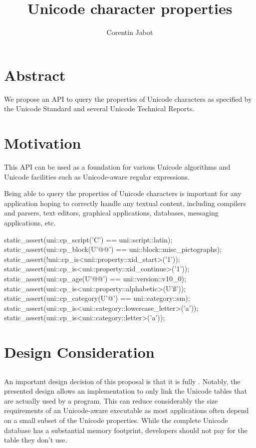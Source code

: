 \documentclass{wg21}
\title{Unicode character properties}
\author{Corentin Jabot}{corentin.jabot@gmail.com}
\begin{document}
\maketitle

\section{Abstract}

We propose an API to query the properties of Unicode characters as specified by the Unicode Standard and
several Unicode Technical Reports.

\section{Motivation}

This API can be used as a foundation for various Unicode algorithms and Unicode facilities such as Unicode-aware
regular expressions.

Being able to query the properties of Unicode characters is important for any application hoping to correctly
handle any textual content, including compilers and parsers, text editors, graphical applications, databases,
messaging applications, etc.

\begin{colorblock}

static_assert(uni::cp_script('C') == uni::script::latin);
static_assert(uni::cp_block(U'@@') == uni::block::misc_pictographs);
static_assert(!uni::cp_is<uni::property::xid_start>('1'));
static_assert(uni::cp_is<uni::property::xid_continue>('1'));
static_assert(uni::cp_age(U'@@') == uni::version::v10_0);
static_assert(uni::cp_is<uni::property::alphabetic>(U'ß'));
static_assert(uni::cp_category(U'@\cap@') == uni::category::sm);
static_assert(uni::cp_is<uni::category::lowercase_letter>('a'));
static_assert(uni::cp_is<uni::category::letter>('a'));

\end{colorblock}

\section{Design Consideration}

\subsection{}

An important design decision of this proposal is that it is fully .
Notably, the presented design allows an implementation to only link the Unicode tables that are actually used by
a program. This can reduce considerably the size requirements of an Unicode-aware executable as most applications
often depend on a small subset of the Unicode properties.
While the complete Unicode database has a substantial memory footprint, developers should
not pay for the table they don't use.
\end{document}
